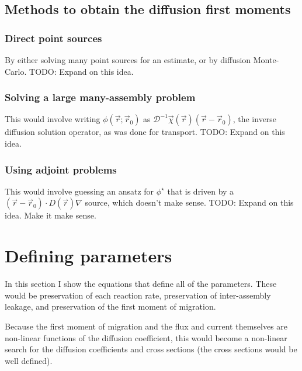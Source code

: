\documentclass[a4paper,letterpaper,12pt,oneside,draft]{article}
\newcommand{\vr}{\ensuremath{\vec{r}}}
\newcommand{\dvr}{\left(\vr-\vr_0\right)}
\begin{document}
    \subsection{Methods to obtain the diffusion first moments}
    \subsubsection{Direct point sources}
    By either solving many point sources for an estimate, or by diffusion Monte-Carlo.
    TODO: Expand on this idea.
    \subsubsection{Solving a large many-assembly problem}
    This would involve writing $\phi(\vr;\vr_0)$ as $\mathcal{D}^{-1}\vec{\chi}(\vr)\dvr$, the inverse diffusion solution operator, as was done for transport.
    TODO: Expand on this idea.
    \subsubsection{Using adjoint problems}
    This would involve guessing an ansatz for $\phi^\star$ that is driven by a $\dvr \cdot D(\vr)\nabla$ source, which doesn't make sense.
    TODO: Expand on this idea. Make it make sense.
    
    
\section{Defining parameters}\label{sec:param}
    In this section I show the equations that define all of the parameters. 
    These would be preservation of each reaction rate, preservation of inter-assembly leakage, and preservation of the first moment of migration.
    
    Because the first moment of migration and the flux and current themselves are non-linear functions of the diffusion coefficient, this would become a non-linear search for the diffusion coefficients and cross sections (the cross sections would be well defined).
    
\end{document}
